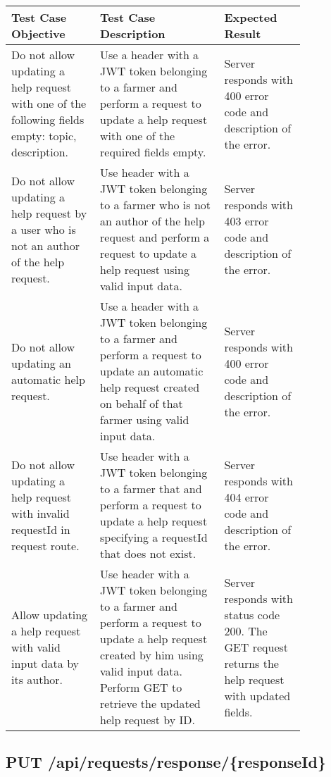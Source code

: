 \begin{longtable}{p{0.25\linewidth}p{0.35\linewidth}p{0.23\linewidth}}
	\toprule
	\textbf{Test Case Objective} & \textbf{Test Case Description} & \textbf{Expected Result}\\
	\midrule
	Do not allow updating a help request with one of the following fields empty: topic, description. & Use a header with a JWT token belonging to a farmer and perform a request to update a help request with one of the required fields empty. & Server responds with 400 error code and description of the error.\\
	\midrule
	Do not allow updating a help request by a user who is not an author of the help request. & Use header with a JWT token belonging to a farmer who is not an author of the help request and perform a request to update a help request using valid input data. & Server responds with 403 error code and description of the error.\\
	\midrule
	Do not allow updating an automatic help request. & Use a header with a JWT token belonging to a farmer and perform a request to update an automatic help request created on behalf of that farmer using valid input data. & Server responds with 400 error code and description of the error.\\
	\midrule
	Do not allow updating a help request with invalid requestId in request route. & Use header with a JWT token belonging to a farmer that and perform a request to update a help request specifying a requestId that does not exist. &  Server responds with 404 error code and description of the error.\\
	\midrule
	Allow updating a help request with valid input data by its author. & Use header with a JWT token belonging to a farmer and perform a request to update a help request created by him using valid input data. Perform GET to retrieve the updated help request by ID. & Server responds with status code 200. The GET request returns the help request with updated fields.\\
	\bottomrule
\end{longtable}

\subsection{PUT \slash api\slash requests\slash response\slash \{responseId\}}


